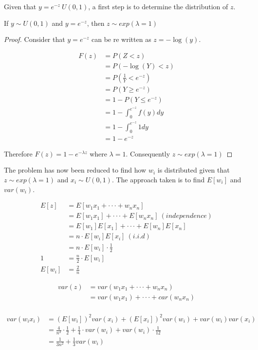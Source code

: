 Given that $y = e^{-z} ~ U(0,1)$, a first step is to determine the distribution of $z$.

\begin{theorem}
	If $y \sim U(0,1)$ and $y = e^{-z}$, then $z \sim exp(\lambda = 1)$
\end{theorem}
\begin{proof}
	Consider that $y = e^{-z}$ can be re written as $z = -\log(y)$.
	
	\begin{align*}
		F(z) &= P(Z < z)\\
		&= P(-\log(Y) < z)\\
		&= P(\frac{1}{Y} < e^{-z})\\
		&= P(Y \geq e^{-z})\\
		&= 1 - P(Y \leq e^{-z})\\
		&= 1 - \int_{0}^{e^{-z}} f(y) dy\\
		&= 1 - \int_{0}^{e^{-z}} 1 dy\\
		&= 1 - e^{-z}
	\end{align*}
	
	Therefore $F(z) = 1 - e^{-\lambda z}$ where $\lambda = 1$. Consequently $z \sim exp(\lambda = 1)$
\end{proof}

The problem has now been reduced to find how $w_i$ is distributed given that $z \sim exp(\lambda = 1)$ and $x_i \sim U(0,1)$. The approach taken is to find $E[w_i]$ and $var(w_i)$.

\begin{align*}
	E[z] &= E[w_1x_1 + \cdot \cdot \cdot + w_nx_n]\\
	&= E[w_1x_1] + \cdot \cdot \cdot + E[w_nx_n]\ (independence)\\
	&= E[w_1]E[x_1] + \cdot \cdot \cdot + E[w_n]E[x_n]\\
	&= n \cdot E[w_i]E[x_i]\ (i.i.d)\\
	&= n \cdot E[w_i] \cdot \frac{1}{2}\\
	1 &= \frac{n}{2} \cdot E[w_i]\\
	E[w_i] &= \frac{2}{n}
\end{align*}

\begin{align*}
	var(z) &= var(w_1x_1 + \cdot \cdot \cdot + w_nx_n)\\
	&= var(w_1x_1) + \cdot \cdot \cdot + car(w_nx_n)\\
\end{align*}

\begin{align*}
	var(w_ix_i) &= (E[w_i])^2var(x_i) + (E[x_i])^2var(w_i) + var(w_i)var(x_i)\\
	&= \frac{4}{n^2} \cdot \frac{1}{2} + \frac{1}{4} \cdot var(w_i) + var(w_i) \cdot \frac{1}{12}\\
	&= \frac{1}{3 n^2} + \frac{1}{3}var(w_i)
\end{align*}

